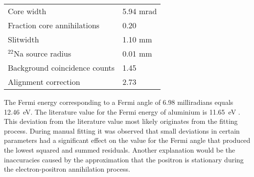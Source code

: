 \begin{table}[H]
\begin{tabularx}{\linewidth}{l X}
    Core width & 5.94 mrad\\
    Fraction core annihilations & 0.20 \\
    Slitwidth & 1.10 mm\\
    $^{22}$Na source radius & 0.01 mm\\
    Background coincidence counts & 1.45\\
    Alignment correction & 2.73 \\ \hline
    \end{tabularx}
\end{table} The Fermi energy corresponding to a Fermi angle of 6.98 milliradians equals 12.46~eV. The literature value for the Fermi energy of aluminium is 11.65~eV \cite{Massalski1978151, ashcroft1976solid}. This deviation from the literature value most likely originates from the fitting process. During manual fitting it was observed that small deviations in certain parameters had a significant effect on the value for the Fermi angle that produced the lowest squared and summed residuals. Another explanation would be the inaccuracies caused by the approximation that the positron is stationary during the electron-positron annihilation process. 